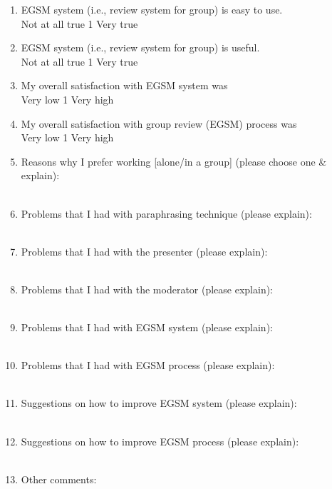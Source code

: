 \begin {enumerate}
\item EGSM system (i.e., review system for group) is easy to use.
\\
Not at all true \hfill 1     \hfill Very true\\

\item EGSM system (i.e., review system for group) is useful.
\\
Not at all true \hfill 1     \hfill Very true\\


\item My overall satisfaction with EGSM system was
\\
Very low \hfill 1     \hfill Very high\\


\item My overall satisfaction with group review (EGSM) process was
\\
Very low \hfill 1     \hfill Very high\\

\item Reasons why I prefer working [alone/in a group] (please choose one
\& explain):
\\
\\

\item Problems that I had with paraphrasing technique (please
explain):
\\
\\

\item Problems that I had with the presenter (please explain):
\\
\\

\item Problems that I had with the moderator (please explain):
\\
\\

\item Problems that I had with EGSM system (please explain): 
\\
\\
\item Problems that I had with EGSM process (please explain): 
\\
\\
\item Suggestions on how to improve EGSM system (please explain):
\\
\\
\item Suggestions on how to improve EGSM process (please explain):
\\
\\

\item Other comments:

\end{enumerate}




